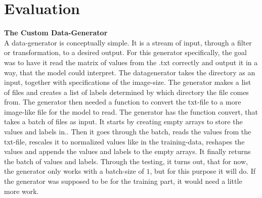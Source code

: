 \section{Evaluation}

\textbf{The Custom Data-Generator}
\\

A data-generator is conceptually simple. It is a stream of input, through a filter or transformation, to a desired output.
For this generator specifically, the goal was to have it read the matrix of values from the .txt correctly and output it in a way, that the model could interpret. The datagenerator takes the directory as an input, together with specifications of the image-size. The generator makes a list of files and creates a list of labels determined by which directory the file comes from. The generator then needed a function to convert the txt-file to a more image-like file for the model to read. The generator has the function convert,  that takes a batch of files as input. It starts by creating empty arrays to store the values and labels in..  Then it goes through the batch, reads the values from the txt-file, rescales it to normalized values like in the training-data, reshapes the values and appends the values and labels to the empty arrays. It finally returns the batch of values and labels. Through the testing, it turns out, that for now, the generator only works with a batch-size of $1$, but for this purpose it will do. If the generator was supposed to be for the training part, it would need a little more work.  


